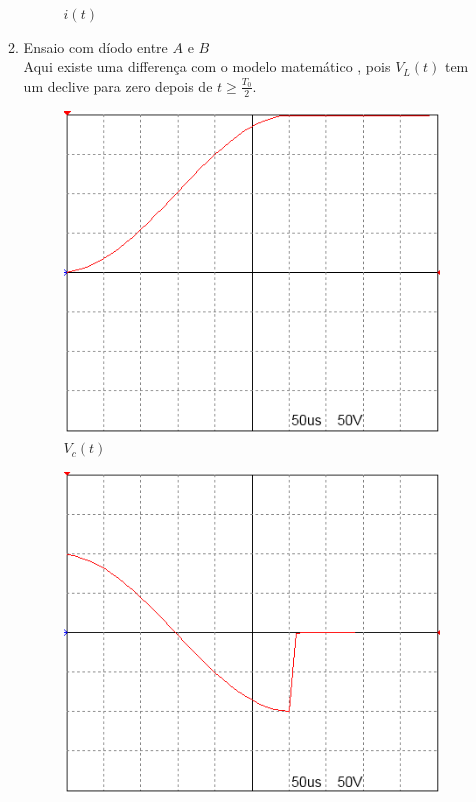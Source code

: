 \documentclass[titlepage, a4paper, 11pt, reqno, openany]{report}
\begin{document}
\begin{enumerate}
\begin{enumerate}
\begin{figure}[H]
\caption{$i(t)$}
\label{figura 8}
\end{figure}\par
\item
Ensaio  com d\'{i}odo  entre $A$ e $B$\\
Aqui existe uma differen\c{c}a  com o modelo  matem\'{a}tico , pois $V_L(t)$ tem um declive  para {\color{blue} zero} depois de $t\geq\frac{T_0}{2}$.\par
%
\begin{figure}[H]
\centering
\includegraphics[scale=1]{./image/PSIM_4.png}
\caption{$V_c(t)$}
\label{figura 9}
\end{figure}\par
%
\begin{figure}[H]
\centering
\includegraphics[scale=1]{./image/PSIM_5.png}

\end{figure}
\end{enumerate}
\end{enumerate}
\end{document}
